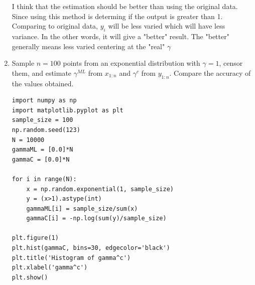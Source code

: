 \documentclass[preprint,12pt]{elsarticle}
\begin{document}
\begin{enumerate}[label=\alph*]
        I think that the estimation should be better than using the original data. Since 
        using this method is determing if the output is greater than 1. Comparing to original
        data, $y_i$ will be less varied which will have less variance. In the other words, 
        it will give a "better" result. The "better" generally means less varied centering at
        the "real" $\gamma$

        \item Sample $n=100$ points from an exponential distribution with $\gamma=1$, 
        censor them, and estimate $\gamma^{ML}$ from $x_{1:n}$ and $\gamma^c$ from 
        $y_{1:n}$. Compare the accuracy of the values obtained.

        \begin{lstlisting}
import numpy as np
import matplotlib.pyplot as plt
sample_size = 100
np.random.seed(123)
N = 10000
gammaML = [0.0]*N
gammaC = [0.0]*N

for i in range(N):
    x = np.random.exponential(1, sample_size)
    y = (x>1).astype(int)
    gammaML[i] = sample_size/sum(x)
    gammaC[i] = -np.log(sum(y)/sample_size)

plt.figure(1)
plt.hist(gammaC, bins=30, edgecolor='black')
plt.title('Histogram of gamma^c')
plt.xlabel('gamma^c')
plt.show()


\end{lstlisting}
\end{enumerate}
\end{document}
